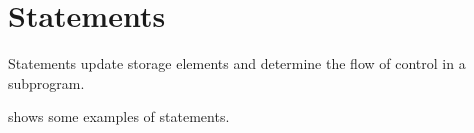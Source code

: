 % 
\chapter{Statements\label{chap:Statements}}
Statements update storage elements and determine the flow of control in a subprogram.

 shows some examples of statements.

